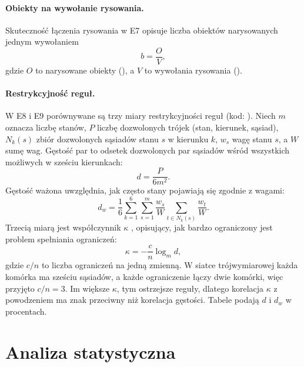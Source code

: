\paragraph{Obiekty na wywołanie rysowania.} Skuteczność łączenia rysowania w E7 opisuje liczba obiektów narysowanych jednym wywołaniem
\begin{equation}
  b = \frac{O}{V} ,
  \label{eq:obiekty-na-wywolanie}
\end{equation}
gdzie $O$ to narysowane obiekty (), a $V$ to wywołania rysowania ().

\paragraph{Restrykcyjność reguł.} W E8 i E9 porównywane są trzy miary restrykcyjności reguł (kod: ). Niech $m$ oznacza liczbę stanów, $P$ liczbę dozwolonych trójek (stan, kierunek, sąsiad), $N_k(s)$ zbiór dozwolonych sąsiadów stanu $s$ w kierunku $k$, $w_s$ wagę stanu $s$, a $W$ sumę wag. Gęstość par to odsetek dozwolonych par sąsiadów wśród wszystkich możliwych w sześciu kierunkach:
\begin{equation}
  d = \frac{P}{6 m^2} .
  \label{eq:gestosc}
\end{equation}
Gęstość ważona uwzględnia, jak często stany pojawiają się zgodnie z wagami:
\begin{equation}
  d_w = \frac{1}{6} \sum_{k=1}^{6} \sum_{s=1}^{m} \frac{w_s}{W} \sum_{t \in N_k(s)} \frac{w_t}{W} .
  \label{eq:gestosc-wazona}
\end{equation}
Trzecią miarą jest współczynnik $\kappa$ \cite{Gent1996}, opisujący, jak bardzo ograniczony jest problem spełniania ograniczeń:
\begin{equation}
  \kappa = -\frac{c}{n} \log_m d ,
  \label{eq:kappa}
\end{equation}
gdzie $c/n$ to liczba ograniczeń na jedną zmienną. W siatce trójwymiarowej każda komórka ma sześciu sąsiadów, a każde ograniczenie łączy dwie komórki, więc przyjęto $c/n = 3$. Im większe $\kappa$, tym ostrzejsze reguły, dlatego korelacja $\kappa$ z powodzeniem ma znak przeciwny niż korelacja gęstości. Tabele podają $d$ i $d_w$ w procentach.

\section{Analiza statystyczna}
\label{sec:statystyka}

